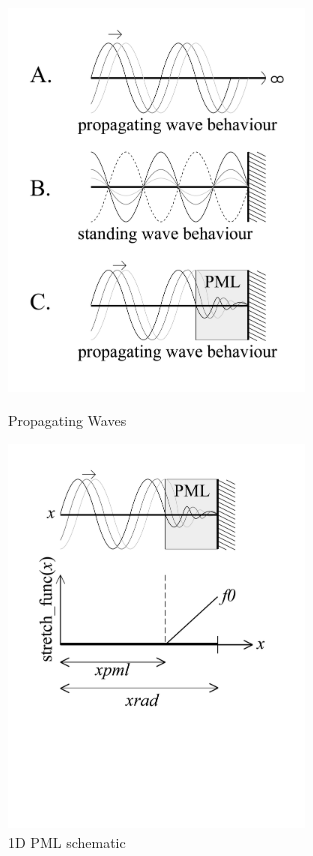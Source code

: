 \begin{figure}[htbp]
  \begin{minipage}{0.45\linewidth}
  \centering
  \includegraphics[trim = 0in 0in 0in 0in, clip, height=4in]{fig/propagatingwaves.pdf}
  \caption{Propagating Waves}
  \label{fig:PropagatingWaves}
  \end{minipage}
  \begin{minipage}{0.45\linewidth}
  \centering
  \includegraphics[trim = 0in 1in 0in 0in, clip, height=4in]{fig/1dpml.pdf}
  \caption{1D PML schematic}
  \label{fig:1DPMLSchematic}
  \end{minipage}
\end{figure}

